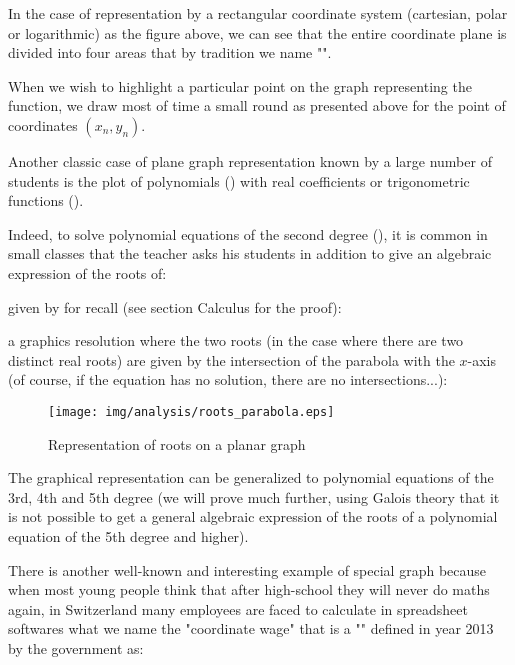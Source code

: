 In the case of representation by a rectangular coordinate system (cartesian, polar or logarithmic) as the figure above, we can see that the entire coordinate plane is divided into four areas that by tradition we name "".

	\begin{tcolorbox}[title=Remark,colframe=black,arc=10pt]
	When we wish to highlight a particular point on the graph representing the function, we draw most of time a small round as presented above for the point of coordinates $(x_n,y_n)$.
	\end{tcolorbox}	

Another classic case of plane graph representation  known by a large number of students is the plot of polynomials () with real coefficients or trigonometric functions ().

Indeed, to solve polynomial equations of the second degree (), it is common in small classes that the teacher asks his students in addition to give an algebraic expression of the roots of:
	
given by for recall (see section Calculus for the proof):
	
a graphics resolution where the two roots (in the case where there are two distinct real roots) are given by the intersection of the parabola with the $x$-axis (of course, if the equation has no solution, there are no intersections...):

\begin{figure}[H]
\centering
\texttt{[image: img/analysis/roots\_parabola.eps]}
\caption{Representation of roots on a planar graph}
\end{figure}

The graphical representation can be generalized to polynomial equations of the 3rd, 4th and 5th degree (we will prove much further, using Galois theory that it is not possible to get a general algebraic expression of the roots of a polynomial equation of the 5th degree and higher).

There is another well-known and interesting example of special graph because when most young people think that after high-school they will never do maths again, in Switzerland many employees are faced to calculate in spreadsheet softwares what we name the "coordinate wage" that is a "" defined in year 2013 by the government as:

